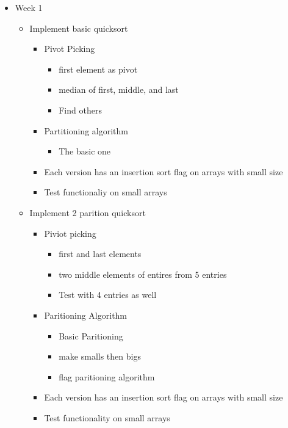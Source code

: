 \documentclass[12pt]{report}
\begin{document}
	\begin{itemize}
		\item Week 1
		\begin{itemize}
			\item Implement basic quicksort
			\begin{itemize}
				\item Pivot Picking
				\begin{itemize}
					\item first element as pivot
					\item median of first, middle, and last
					\item Find others
				\end{itemize}
				
				\item Partitioning algorithm
				\begin{itemize}
					\item The basic one
				\end{itemize}
				\item Each version has an insertion sort flag on arrays with small size
				\item Test functionaliy on small arrays
			\end{itemize}
			
			\item Implement 2 parition quicksort
			\begin{itemize}
				\item Piviot picking
				\begin{itemize}
					\item first and last elements
					\item two middle elements of entires from 5 entries
					\item Test with 4 entries as well
				\end{itemize}
				\item Paritioning Algorithm
				\begin{itemize}
					\item Basic Paritioning
					\item make smalls then bigs
					\item flag paritioning algorithm
				\end{itemize}
				\item Each version has an insertion sort flag on arrays with small size
				\item Test functionality on small arrays
			\end{itemize}
		\end{itemize}
			

\end{itemize}
\end{document}
